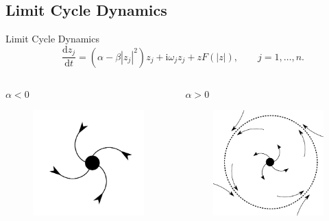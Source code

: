 \documentclass[10pt,reqno]{beamer}
\newcommand{\D}[2]{\frac{\mathrm{d} #1}{\mathrm{d} #2}}
\newcommand{\I}{\mathrm{i}}
\begin{document}
\subsection{Limit Cycle Dynamics}
\begin{frame}{Limit Cycle Dynamics}
\[
\quad \D{z_j}{t} = (\alpha - \beta|z_j|^2)z_j + \I\omega_jz_j +zF(|z|), \qquad j = 1,\ldots, n.
\]
\vfill
\begin{columns}
\begin{column}{.49\textwidth}
	\centering $\alpha <0$
	\begin{figure}
		\includegraphics[scale = 0.16]{node.png}
	\end{figure}
\end{column}
\begin{column}{.49\textwidth}
\begin{tcolorbox}[notitle, boxrule=1pt, colback=white]
	\centering
	$\alpha >0$
	\begin{figure}
		\includegraphics[scale = 0.16]{hopf.png}

\end{figure}
\end{tcolorbox}
\end{column}
\end{columns}
\end{frame}
\end{document}
